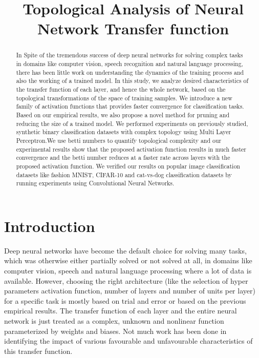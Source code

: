 \documentclass{bmvc2k}
\title{Topological Analysis of Neural Network Transfer function}
\begin{document}
\maketitle

\begin{abstract}
In Spite of the tremendous success of deep neural networks for solving complex tasks in domains like computer vision, speech recognition and natural language processing,  there has been little work on understanding the dynamics of the training process and also the working of a trained model. In this study, we analyze desired characteristics of the transfer function of each layer, and hence  the whole network,  based on the topological transformations of the space of training samples. We introduce a new family of activation functions that provides faster convergence for classification tasks. Based on our empirical results, we also propose a novel method for pruning and reducing the size of a trained model. We performed  experiments on previously studied, synthetic binary classification datasets with complex topology using Multi Layer Perceptron.We use betti numbers to quantify topological complexity and our experimental results show that the proposed activation function results in much faster convergence and the betti number reduces at a faster rate across layers with the proposed activation function. We verified our results on popular image classification datasets like fashion MNIST, CIFAR-10 and cat-vs-dog classification datasets by running experiments using Convolutional Neural Networks.
\end{abstract}

\section{Introduction}
\label{sec:intro}
Deep neural networks have become the default choice for solving many tasks, which was otherwise either partially solved or not solved at all,  in domains like computer vision, speech and natural language processing where a lot of data is available. However, choosing the right architecture (like the  selection  of hyper parameters activation function, number of layers and number of units per layer)  for a specific task is mostly based on trial and error or based on the previous empirical results. The transfer function of each layer and the entire neural network is just treated as a complex, unknown and nonlinear function parameterized by weights and biases. Not much work has been done in identifying the impact of various favourable and unfavourable characteristics of this transfer function.
\end{document}
